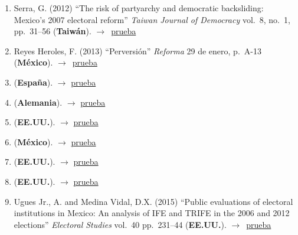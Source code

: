 \documentclass[12 pt, letter]{article}
\newenvironment{CitasMiTrabajo}{
    \begin{footnotesize}
    \begin{enumerate}[label={\footnotesize\emph{cita~\arabic*}},ref=\arabic*] %
        \setlength{\itemsep}{.1\itemsep}
        \setlength{\parskip}{.1\parskip}
    }{\end{enumerate}\end{footnotesize}}
\begin{document}
\begin{CitasMiTrabajo}
        \item Serra, G. (2012)
            ``The risk of partyarchy and democratic backsliding: Mexico's 2007 electoral reform''
            \emph{Taiwan Journal of Democracy}
            vol.\ 8, no.\ 1, pp.\ 31--56 (\textbf{Taiw\'an}). $\rightarrow$~\href{http://ericmagar.com/cv/cites/estevezEtalElecStud/serraElecRefMexico2012tjd.pdf}{prueba}

        \item Reyes Heroles, F. (2013)
            ``Perversi\'on''
            \emph{Reforma}
            29 de enero, p.\ A-13 (\textbf{M\'exico}). $\rightarrow$~\href{http://ericmagar.com/cv/cites/estevezEtalElecStud/reyesHeroles2013.pdf}{prueba}

        \item {} (\textbf{Espa\~na}).  $\rightarrow$ \href{http://ericmagar.com/cv/cites/estevezEtalElecStud/martinTrife2012amlh.pdf}{prueba}

        \item {} (\textbf{Alemania}).  $\rightarrow$ \href{http://ericmagar.com/cv/cites/estevezEtalElecStud/serraDemiseResurrection2013jpla.pdf}{prueba}

        \item {} (\textbf{EE.UU.}).  $\rightarrow$ \href{http://ericmagar.com/cv/cites/estevezEtalElecStud/diazDominguez2014phd.pdf}{prueba}

        \item {} (\textbf{M\'exico}).  $\rightarrow$ \href{http://ericmagar.com/cv/cites/estevezEtalElecStud/garciaEscon2014phd.pdf}{prueba}

        \item {} (\textbf{EE.UU.}).  $\rightarrow$ \href{http://ericmagar.com/cv/cites/estevezEtalElecStud/resendiz2014.pdf}{prueba}

        \item {} (\textbf{EE.UU.}).  $\rightarrow$ \href{http://ericmagar.com/cv/cites/estevezEtalElecStud/arevalo2015.pdf}{prueba}

        \item Ugues Jr., A. and Medina Vidal, D.X. (2015)
            ``Public evaluations of electoral institutions in Mexico: An analysis of IFE and TRIFE in the 2006 and 2012 elections''
            \emph{Electoral Studies}
            vol.\ 40 pp.\ 231--44 (\textbf{EE.UU.}). $\rightarrow$~\href{http://ericmagar.com/cv/cites/estevezEtalElecStud/ugues.medinaPubEvalElectoralInstitutionsMexico2015es.excerpt.pdf}{prueba}


\end{CitasMiTrabajo}
\end{document}
